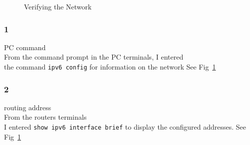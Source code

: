 \documentclass[../EngineeringJournal_CDavis.tex]{subfiles}
\begin{document}
\begin{figure}[!hbt]\centering
{}\par
{}\hfill 
{}
\caption{Verifying the Network}
\label{IPv65ver}
\end{figure}

\subsubsection{1}{PC command}
\\From the command prompt in the PC terminals, I entered
\\the command \verb$ipv6 config$ for information on the network See
Fig~\ref{IPv65ver}

\subsubsection{2}{routing address}
\\From the routers terminals 
\\I entered \verb$show ipv6 interface brief$  to display the configured addresses. See
Fig~\ref{IPv65ver}
\end{document}
